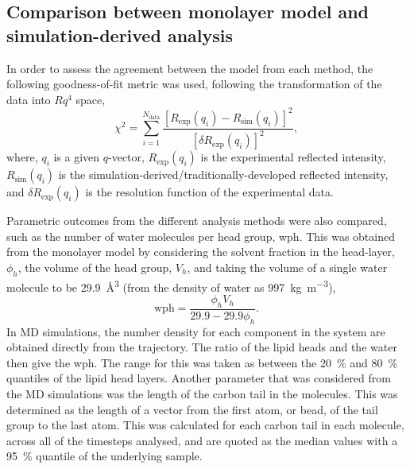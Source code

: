 \subsection{Comparison between monolayer model and simulation-derived analysis}
In order to assess the agreement between the model from each method, the following goodness-of-fit metric was used, following the transformation of the data into $Rq^4$ space,
%
\begin{equation}
\chi^2 = \sum_{i=1}^{N_{\text{data}}}{\frac{[R_{\text{exp}}(q_i) - R_{\text{sim}}(q_i)]^2}{[\delta R_{\text{exp}}(q_i)]^2}},
\end{equation}
%
where, $q_i$ is a given $q$-vector, $R_{\text{exp}}(q_i)$ is the experimental reflected intensity, $R_{\text{sim}}(q_i)$ is the simulation-derived/traditionally-developed reflected intensity, and $\delta R_{\text{exp}}(q_i)$ is the resolution function of the experimental data.

Parametric outcomes from the different analysis methods were also compared, such as the number of water molecules per head group, wph.
This was obtained from the monolayer model by considering the solvent fraction in the head-layer, $\phi_h$, the volume of the head group, $V_h$, and taking the volume of a single water molecule to be \SI{29.9}{\angstrom\cubed} (from the density of water as \SI{997}{\kg\per\meter\cubed}),
%
\begin{equation}
\text{wph}=\frac{\phi_h V_h}{29.9 - 29.9\phi_h}.
\label{equ:wph}
\end{equation}
%
In MD simulations, the number density for each component in the system are obtained directly from the trajectory.
The ratio of the lipid heads and the water then give the wph.
The range for this was taken as between the \SI{20}{\percent} and \SI{80}{\percent} quantiles of the lipid head layers.
Another parameter that was considered from the MD simulations was the length of the carbon tail in the molecules.
This was determined as the length of a vector from the first atom, or bead, of the tail group to the last atom.
This was calculated for each carbon tail in each molecule, across all of the timesteps analysed, and are quoted as the median values with a \SI{95}{\percent} quantile of the underlying sample.
